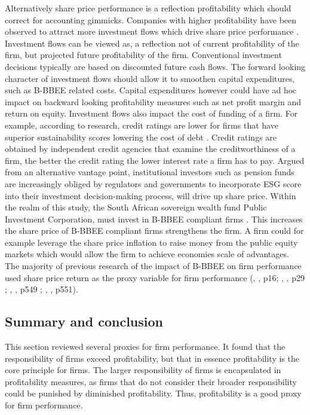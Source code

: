 Alternatively share price performance is a reflection profitability which should correct for accounting gimmicks. Companies with higher profitability have been observed to attract more investment flows which drive share price performance \cite[p59]{N4}. Investment flows can be viewed as, a reflection not of current profitability of the firm, but projected future profitability of the firm. Conventional investment decisions typically are based on discounted future cash flows. The forward looking character of investment flows should allow it to smoothen capital expenditures, such as B-BBEE related costs. Capital expenditures however could have ad hoc impact on backward looking profitability measures such as net profit margin and return on equity. Investment flows also impact the cost of funding of a firm. For example, according to research, credit ratings are lower for firms that have superior sustainability scores lowering the cost of debt \cite[p24]{N16}. Credit ratings are obtained by independent credit agencies that examine the creditworthiness of a firm, the better the credit rating the lower interest rate a firm has to pay. Argued from an alternative vantage point, institutional investors such as pension funds are increasingly obliged by regulators and governments to incorporate ESG score into their investment decision-making process, will drive up share price. Within the realm of this study, the South African sovereign wealth fund Public Investment Corporation, must invest in B-BBEE compliant firms \cite[p27]{N23}. This increases the share price of B-BBEE compliant firms strengthens the firm. A firm could for example leverage the share price inflation to raise money from the public equity markets which would allow the firm to achieve economies scale of advantages. The majority of previous research of the impact of B-BBEE on firm performance used share price return as the proxy variable for firm performance (\citeauthor{N24}, \citeyear{N24}, p16; \citeauthor{N23}, \citeyear{N23}, p29 ; \citeauthor{N27}, \citeyear{N27}, p549 ; \citeauthor{N7}, \citeyear{N7}, p551). 
\subsection{Summary and conclusion}
This section reviewed several proxies for firm performance. It found that the responsibility of firms exceed profitability, but that in essence profitability is the core principle for firms. The larger responsibility of firms is encapsulated in profitability measures, as firms that do not consider their broader responsibility could be punished by diminished profitability. Thus, profitability is a good proxy for firm performance.


